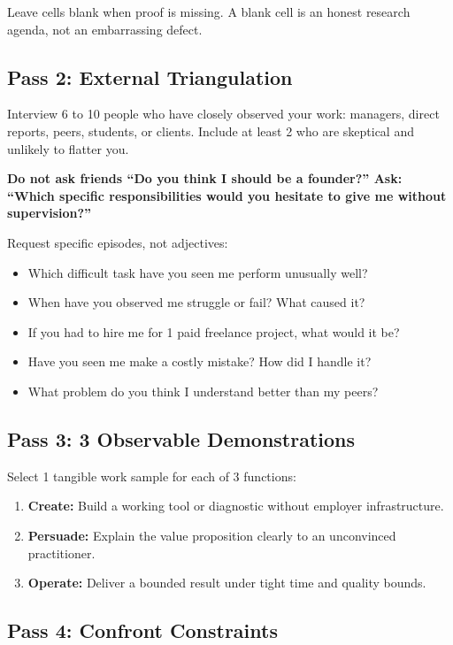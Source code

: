 Leave cells blank when proof is missing. A blank cell is an honest research agenda, not an embarrassing defect.

\subsection{Pass 2: External Triangulation}

Interview 6 to 10 people who have closely observed your work: managers, direct reports, peers, students, or clients. Include at least 2 who are skeptical and unlikely to flatter you.

\textbf{Do not ask friends ``Do you think I should be a founder?'' Ask: ``Which specific responsibilities would you hesitate to give me without supervision?''}

Request specific episodes, not adjectives:
\begin{itemize}[leftmargin=11pt,itemsep=1pt,topsep=1pt,parsep=0pt]
  \item Which difficult task have you seen me perform unusually well?
  \item When have you observed me struggle or fail? What caused it?
  \item If you had to hire me for 1 paid freelance project, what would it be?
  \item Have you seen me make a costly mistake? How did I handle it?
  \item What problem do you think I understand better than my peers?
\end{itemize}

\subsection{Pass 3: 3 Observable Demonstrations}

Select 1 tangible work sample for each of 3 functions:
\begin{enumerate}[label=\textbf{\arabic*.},leftmargin=11pt,itemsep=1.5pt,topsep=1.5pt,parsep=0pt]
  \item \textbf{Create:} Build a working tool or diagnostic without employer infrastructure.
  \item \textbf{Persuade:} Explain the value proposition clearly to an unconvinced practitioner.
  \item \textbf{Operate:} Deliver a bounded result under tight time and quality bounds.
\end{enumerate}

\subsection{Pass 4: Confront Constraints}

